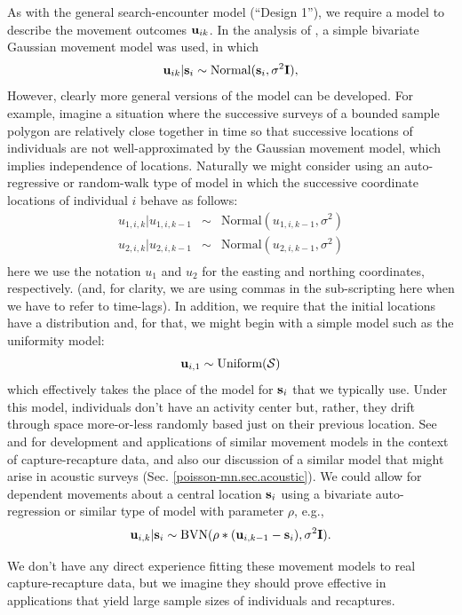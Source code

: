 As with the general search-encounter model (``Design 1''), we require
a model to describe the movement outcomes ${\bf u}_{ik}$.
In the analysis of \citet{royle_young:2008}, a simple bivariate
Gaussian movement model was used, in which
\[
 {\bf u}_{ik} | {\bf s}_{i} \sim \mbox{Normal}({\bf s}_{i}, \sigma^{2}{\bf I}),
\]
However, clearly more general versions of the model can be developed.
For example, imagine a situation where the successive surveys of a
bounded sample polygon are relatively close together in time so that
successive locations of individuals are not well-approximated by the
Gaussian movement model, which implies independence of
locations. Naturally we might consider using an auto-regressive or
random-walk type of model in which the successive coordinate locations
of individual $i$ behave as follows:
\begin{eqnarray*}
 u_{1,i,k} | u_{1,i,k-1} &\sim &  \mbox{Normal}( u_{1,i,k-1},  \sigma^{2}) \\
 u_{2,i,k} | u_{2,i,k-1} &\sim &  \mbox{Normal}( u_{2,i,k-1},  \sigma^{2}) \\
\end{eqnarray*}
here we use the notation $u_{1}$ and $u_{2}$ for the easting and
northing coordinates, respectively. (and, for clarity, we are using
commas in the sub-scripting here when we have to refer to time-lags).
 In addition, we require that the initial locations have a
distribution and, for that, we might begin with a simple model such as
the uniformity model:
\[
 {\bf u}_{i,1} \sim \mbox{Uniform}({\cal S})
\]
which effectively takes the place of the model for ${\bf s}_{i}$ that
we typically use. Under this model, individuals don't have an activity
center but, rather, they drift through space more-or-less randomly
based just on their previous location. See \citet{ovaskainen:2004} and
\citet{ovaskainen_etal:2008} for development and applications of similar
movement models in the context of capture-recapture data,
and also our discussion of a similar model that might arise in
acoustic surveys (Sec. \ref{poisson-mn.sec.acoustic}).  We could allow
for dependent movements about a central location ${\bf s}_{i}$ using a
bivariate auto-regression or similar type of model with parameter
$\rho$, e.g.,
\[
 {\bf u}_{i,k} | {\bf s}_{i} \sim   \mbox{BVN}( \rho*( {\bf u}_{i,k-1} - {\bf s}_{i} ),  \sigma^{2} {\bf I}).
\]

We don't have any direct experience fitting these movement models to
real capture-recapture data, but we imagine they should prove
effective in applications that yield large sample sizes of individuals
and recaptures. 

